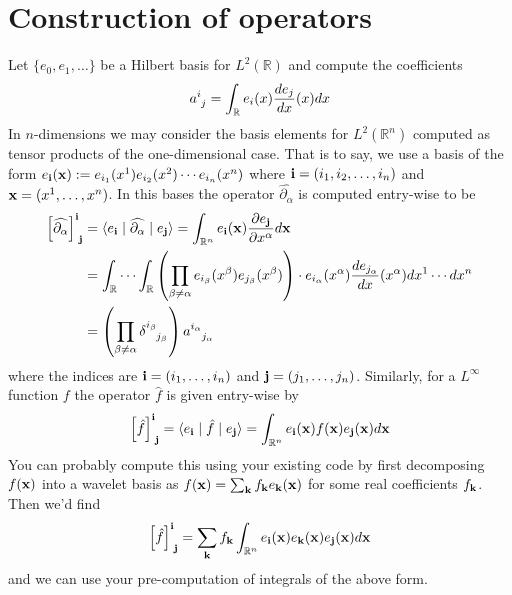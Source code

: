 \documentclass[12pt]{amsart}
\newcommand{\pder}[2]{\ensuremath{\frac{ \partial #1}{\partial #2}}}
\begin{document}
\section{Construction of operators}
Let $\{ e_0 , e_1, \dots \}$ be a Hilbert basis for $L^2(\mathbb{R})$ and compute the coefficients
\begin{align*}
	a \indices{^i_j} = \int_{\mathbb{R}} e_i(x) \frac{d e_j}{dx} (x) dx
\end{align*}
In $n$-dimensions we may consider the basis elements for $L^2(\mathbb{R}^n)$ computed as tensor products of the one-dimensional case.
That is to say, we use a basis of the form $e_{\bf i}({\bf x}) := e_{i_1}(x^1) e_{i_2}(x^2) \cdots e_{i_n}(x^n)$
where ${\bf i} = (i_1,i_2,\dots,i_n)$ and ${\bf x} = (x^1,\dots,x^n)$.
In this bases the operator $\widehat{\partial_\alpha}$ is computed entry-wise to be
\begin{align*}
	\left[ \widehat{\partial_\alpha} \right]\indices{^{\bf i}_{\bf j}} &= \langle e_{\bf i} \mid \widehat{\partial_\alpha} \mid e_{\bf j} \rangle = \int_{\mathbb{R}^n} e_{\bf i}( {\bf x} ) \pder{ e_{\bf j} }{x^\alpha} d{\bf x} \\
		&= \int_{\mathbb{R}} \cdots \int_{\mathbb{R}} \left( \prod_{\beta \neq \alpha} e_{i_\beta}(x^\beta) e_{j_\beta}(x^\beta) \right) \cdot e_{i_\alpha} (x^\alpha) \frac{de_{j_\alpha}}{dx}(x^\alpha) dx^1 \cdots dx^n \\
		&= \left( \prod_{ \beta \neq \alpha} \delta \indices{^{i_\beta}_{j_\beta}} \right) a \indices{^{i_\alpha}_{j_{\alpha}}}
\end{align*}
where the indices are ${\bf i} = (i_1,\dots,i_n)$ and ${\bf j} = (j_1,\dots,j_n)$.
Similarly, for a $L^\infty$ function $f$ the operator $\hat{f}$ is given entry-wise by
\begin{align*}
	\left[ \hat{f} \right] \indices{^{\bf i}_{\bf j} } = \langle e_{\bf i} \mid \hat{f} \mid e_{\bf j} \rangle = \int_{\mathbb{R}^n} e_{\bf i}({\bf x}) f({\bf x}) e_{\bf j}({\bf x}) d{\bf x}
\end{align*}
You can probably compute this using your existing code by first decomposing $f(\bf x)$ into a wavelet basis as $f ({\bf x})= \sum_{\bf k} f_{\bf k} e_{\bf k}({\bf x})$ for some real coefficients $f_{\bf k}$.
Then we'd find
\begin{align*}
	\left[ \hat{f} \right]\indices{^{\bf i}_{\bf j}} = \sum_{\bf k} f_{\bf k} \int_{\mathbb{R}^n} e_{\bf i}({\bf x})e_{\bf k}({\bf x}) e_{\bf j}({\bf x}) d{\bf x}
\end{align*}
and we can use your pre-computation of integrals of the above form.
\end{document}
